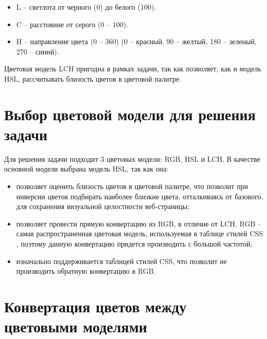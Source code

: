 \begin{itemize}
	\item L -- светлота от черного (0) до белого (100).
	\item C -- расстояние от серого (0 -- 100).
	\item H -- направление цвета (0 -- 360) (0 -- красный, 90 -- желтый, 180 -- зеленый, 270 -- синий).
\end{itemize}

Цветовая модель LCH пригодна в рамках задачи, так как позволяет, как и модель HSL, рассчитывать близость цветов в цветовой палитре.

\section{Выбор цветовой модели для решения задачи}

Для решения задачи подходит 3 цветовых модели: RGB, HSL и LCH. В качестве основной модели выбрана модель HSL, так как она:

\begin{itemize}
	\item позволяет оценить близость цветов в цветовой палитре, что позволит при инверсии цветов подбирать наиболее близкие цвета, отталкиваясь от базового, для сохранения визуальной целостности веб-страницы;
	\item позволяет провести прямую конвертацию из RGB, в отличие от LCH. RGB -- самая распространенная цветовая модель, используемая в таблице стилей CSS \cite{cssmostusedcm}, поэтому данную конвертацию придется производить с большой частотой;
	\item изначально поддерживается таблицей стилей CSS, что позволит не производить обратную конвертацию в RGB.
\end{itemize}

\section{Конвертация цветов между цветовыми моделями}

